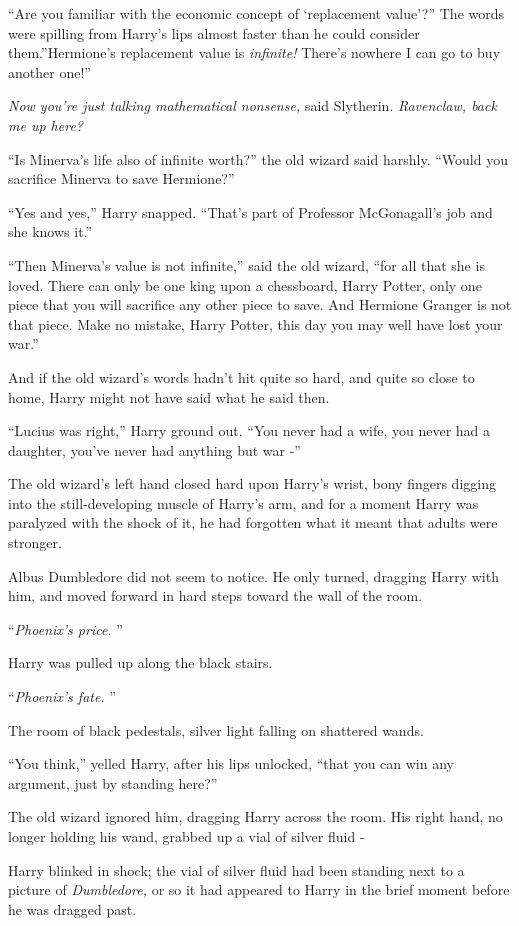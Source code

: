 ``Are you familiar with the economic concept of `replacement value'?''
The words were spilling from Harry's lips almost faster than he could
consider them.''Hermione's replacement value is \emph{infinite!} There's
nowhere I can go to buy another one!''

\emph{Now you're just talking mathematical nonsense,} said Slytherin.
\emph{Ravenclaw, back me up here?}

``Is Minerva's life also of infinite worth?'' the old wizard said
harshly. ``Would you sacrifice Minerva to save Hermione?''

``Yes and yes,'' Harry snapped. ``That's part of Professor McGonagall's
job and she knows it.''

``Then Minerva's value is not infinite,'' said the old wizard, ``for all
that she is loved. There can only be one king upon a chessboard, Harry
Potter, only one piece that you will sacrifice any other piece to save.
And Hermione Granger is not that piece. Make no mistake, Harry Potter,
this day you may well have lost your war.''

And if the old wizard's words hadn't hit quite so hard, and quite so
close to home, Harry might not have said what he said then.

``Lucius was right,'' Harry ground out. ``You never had a wife, you
never had a daughter, you've never had anything but war -''

The old wizard's left hand closed hard upon Harry's wrist, bony fingers
digging into the still-developing muscle of Harry's arm, and for a
moment Harry was paralyzed with the shock of it, he had forgotten what
it meant that adults were stronger.

Albus Dumbledore did not seem to notice. He only turned, dragging Harry
with him, and moved forward in hard steps toward the wall of the room.

``\emph{Phoenix's price.} ''

Harry was pulled up along the black stairs.

``\emph{Phoenix's fate.} ''

The room of black pedestals, silver light falling on shattered wands.

``You think,'' yelled Harry, after his lips unlocked, ``that you can win
any argument, just by standing here?''

The old wizard ignored him, dragging Harry across the room. His right
hand, no longer holding his wand, grabbed up a vial of silver fluid -

Harry blinked in shock; the vial of silver fluid had been standing next
to a picture of \emph{Dumbledore,} or so it had appeared to Harry in the
brief moment before he was dragged past.

